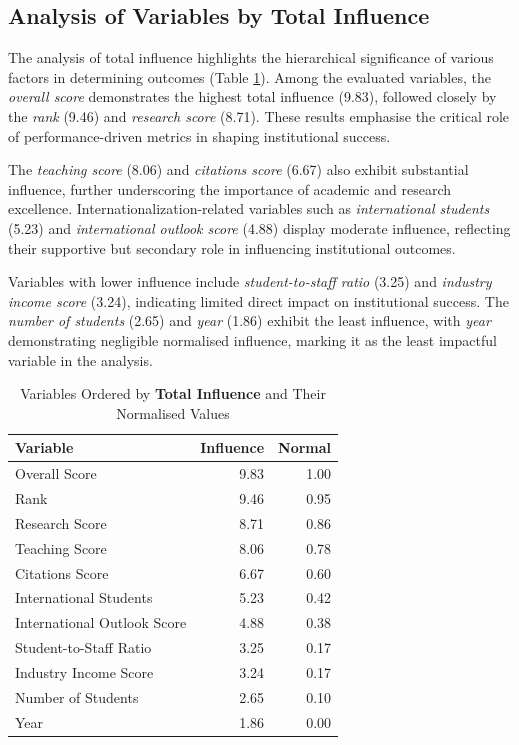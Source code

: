 \documentclass[sigconf]{acmart}
\begin{document}
\subsection{Analysis of Variables by Total Influence}

The analysis of total influence highlights the hierarchical significance of various factors in determining outcomes (Table \ref{tab:total_influence}). Among the evaluated variables, the \textit{overall score} demonstrates the highest total influence (9.83), followed closely by the \textit{rank} (9.46) and \textit{research score} (8.71). These results emphasise the critical role of performance-driven metrics in shaping institutional success.

The \textit{teaching score} (8.06) and \textit{citations score} (6.67) also exhibit substantial influence, further underscoring the importance of academic and research excellence. Internationalization-related variables such as \textit{international students} (5.23) and \textit{international outlook score} (4.88) display moderate influence, reflecting their supportive but secondary role in influencing institutional outcomes.

Variables with lower influence include \textit{student-to-staff ratio} (3.25) and \textit{industry income score} (3.24), indicating limited direct impact on institutional success. The \textit{number of students} (2.65) and \textit{year} (1.86) exhibit the least influence, with \textit{year} demonstrating negligible normalised influence, marking it as the least impactful variable in the analysis.

\begin{table}[h!]
	\centering
	\caption{Variables Ordered by \textbf{Total Influence} and Their Normalised Values}
	\label{tab:total_influence}
	\begin{tabular}{|l|r|r|}
		\hline
		\textbf{Variable} & \textbf{Influence} & \textbf{Normal} \\
		\hline
		Overall Score & 9.83 & 1.00 \\
		Rank & 9.46 & 0.95 \\
		Research Score & 8.71 & 0.86 \\
		Teaching Score & 8.06 & 0.78 \\
		Citations Score & 6.67 & 0.60 \\
		International Students & 5.23 & 0.42 \\
		International Outlook Score & 4.88 & 0.38 \\
		Student-to-Staff Ratio & 3.25 & 0.17 \\
		Industry Income Score & 3.24 & 0.17 \\
		Number of Students & 2.65 & 0.10 \\
		Year & 1.86 & 0.00 \\
		\hline
	\end{tabular}
\end{table}
\end{document}
